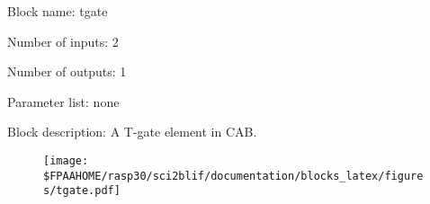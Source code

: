 \pagebreak

Block name: tgate

Number of inputs: 2

Number of outputs: 1

Parameter list: none

Block description: 
A T-gate element in CAB.

\begin{figure}[H]  %
\texttt{[image: \$FPAAHOME/rasp30/sci2blif/documentation/blocks\_latex/figures/tgate.pdf]}
\end{figure}

